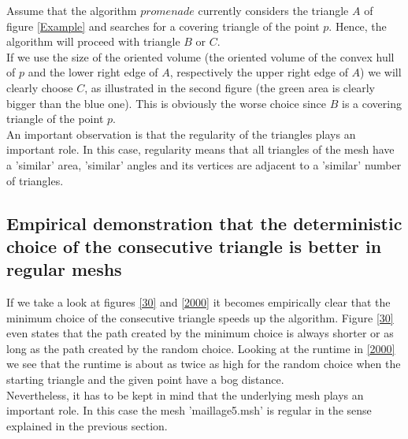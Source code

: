 \documentclass[10pt]{article}
\begin{document}
	Assume that the algorithm $ promenade $ currently considers  the triangle $ A $ of figure \ref{Example} and searches for a covering triangle of the point $ p $.
	Hence, the algorithm will proceed with triangle $ B $ or $ C $. \\
	 If we use the size of the oriented volume (the oriented volume of the convex hull of $ p $ and the lower right edge of $ A $, respectively the upper right edge of $ A $) we will clearly choose $ C $, as illustrated in the second figure (the green area is clearly bigger than the blue one). This is obviously the worse choice since $ B $ is a covering triangle of the point $ p $.  \\
	 An important observation is that the regularity of the triangles plays an important role. In this case, regularity means that all triangles of the mesh have a 'similar' area, 'similar' angles and its vertices are adjacent to a 'similar' number of triangles.

\subsection{Empirical demonstration that the deterministic choice of the consecutive triangle is better in regular meshs}
If we take a look at figures \ref{30} and \ref{2000} it becomes empirically clear that the minimum choice of the consecutive triangle speeds up the algorithm. Figure \ref{30} even states that the path created by the minimum choice is always shorter or as long as the path created by the random choice. Looking at the runtime in \ref{2000} we see that the runtime is about as twice as high for the random choice when the starting triangle and the given point have a bog distance. 
 \\
Nevertheless, it has to be kept in mind that the underlying mesh plays an important role.
In this case the mesh 'maillage5.msh' is regular in the sense explained in the previous section.  
\end{document}
